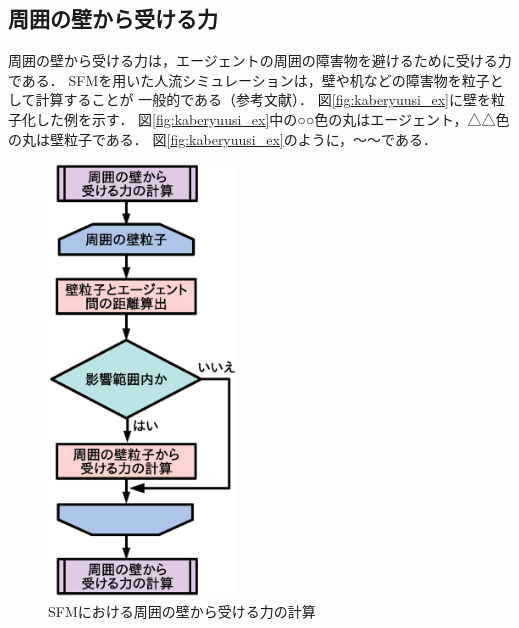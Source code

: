 \newpage
\subsection{周囲の壁から受ける力}
周囲の壁から受ける力は，エージェントの周囲の障害物を避けるために受ける力である．
SFMを用いた人流シミュレーションは，壁や机などの障害物を粒子として計算することが
一般的である（参考文献）．
図\ref{fig:kaberyuusi_ex}に壁を粒子化した例を示す．
図\ref{fig:kaberyuusi_ex}中の○○色の丸はエージェント，△△色の丸は壁粒子である．
図\ref{fig:kaberyuusi_ex}のように，〜〜である．



\begin{figure}[hbtp]
 \begin{center}
  \includegraphics[width=5cm,clip]{figure/kabe_flow.eps}
  \caption{SFMにおける周囲の壁から受ける力の計算}
  \label{fig:sfm_flowchart}
 \end{center}
\end{figure}

\newpage
